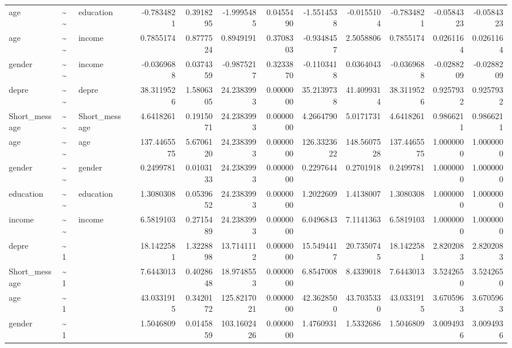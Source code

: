 \documentclass[
]{article}
\begin{document}
\begin{table}[!h]
\begin{tabular}[t]{llllrrrrrrrrr}
age & \textasciitilde{}\textasciitilde{} & education &  & -0.7834821 & 0.3918295 & -1.9995485 & 0.0455490 & -1.5514538 & -0.0155104 & -0.7834821 & -0.0584323 & -0.0584323\\
age & \textasciitilde{}\textasciitilde{} & income &  & 0.7855174 & 0.8777524 & 0.8949191 & 0.3708303 & -0.9348457 & 2.5058806 & 0.7855174 & 0.0261164 & 0.0261164\\
gender & \textasciitilde{}\textasciitilde{} & income &  & -0.0369688 & 0.0374359 & -0.9875217 & 0.3233870 & -0.1103418 & 0.0364043 & -0.0369688 & -0.0288209 & -0.0288209\\
\addlinespace
depre & \textasciitilde{}\textasciitilde{} & depre &  & 38.3119526 & 1.5806305 & 24.2383993 & 0.0000000 & 35.2139738 & 41.4099314 & 38.3119526 & 0.9257932 & 0.9257932\\
Short\_message & \textasciitilde{}\textasciitilde{} & Short\_message &  & 4.6418261 & 0.1915071 & 24.2383993 & 0.0000000 & 4.2664790 & 5.0171731 & 4.6418261 & 0.9866211 & 0.9866211\\
age & \textasciitilde{}\textasciitilde{} & age &  & 137.4465575 & 5.6706120 & 24.2383993 & 0.0000000 & 126.3323622 & 148.5607528 & 137.4465575 & 1.0000000 & 1.0000000\\
gender & \textasciitilde{}\textasciitilde{} & gender &  & 0.2499781 & 0.0103133 & 24.2383993 & 0.0000000 & 0.2297644 & 0.2701918 & 0.2499781 & 1.0000000 & 1.0000000\\
education & \textasciitilde{}\textasciitilde{} & education &  & 1.3080308 & 0.0539652 & 24.2383993 & 0.0000000 & 1.2022609 & 1.4138007 & 1.3080308 & 1.0000000 & 1.0000000\\
\addlinespace
income & \textasciitilde{}\textasciitilde{} & income &  & 6.5819103 & 0.2715489 & 24.2383993 & 0.0000000 & 6.0496843 & 7.1141363 & 6.5819103 & 1.0000000 & 1.0000000\\
depre & \textasciitilde{}1 &  &  & 18.1422581 & 1.3228898 & 13.7141112 & 0.0000000 & 15.5494417 & 20.7350745 & 18.1422581 & 2.8202083 & 2.8202083\\
Short\_message & \textasciitilde{}1 &  &  & 7.6443013 & 0.4028648 & 18.9748553 & 0.0000000 & 6.8547008 & 8.4339018 & 7.6443013 & 3.5242650 & 3.5242650\\
age & \textasciitilde{}1 &  &  & 43.0331915 & 0.3420172 & 125.8217021 & 0.0000000 & 42.3628500 & 43.7035330 & 43.0331915 & 3.6705963 & 3.6705963\\
gender & \textasciitilde{}1 &  &  & 1.5046809 & 0.0145859 & 103.1602426 & 0.0000000 & 1.4760931 & 1.5332686 & 1.5046809 & 3.0094936 & 3.0094936\\

\end{tabular}
\end{table}
\end{document}
